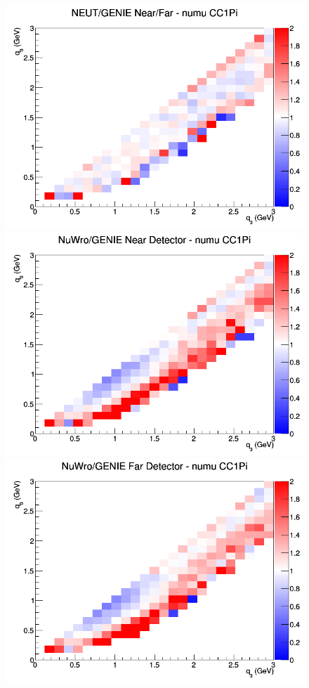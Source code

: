 \documentclass[12pt]{article}
\begin{document}
\begin{figure}[h]
\endminipage
{}
\includegraphics[width=\linewidth]{q0_q3/nominal/ratios/CC1Pi_NEUT_GENIE_numu_NF_q3_q0.png}
\endminipage
\newline
{}
\includegraphics[width=\linewidth]{q0_q3/nominal/ratios/CC1Pi_NuWro_GENIE_numu_near_q3_q0.png}
\endminipage
{}
\includegraphics[width=\linewidth]{q0_q3/nominal/ratios/CC1Pi_NuWro_GENIE_numu_far_q3_q0.png}

\end{figure}
\end{document}
